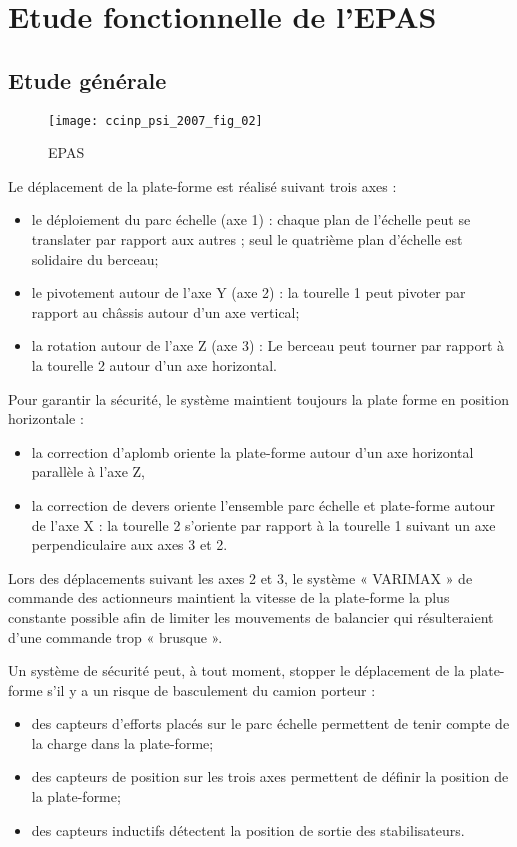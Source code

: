 \section{Etude fonctionnelle de l'EPAS}
\subsection{Etude générale}

\begin{figure}[H]
\centering
\texttt{[image: ccinp\_psi\_2007\_fig\_02]}
\caption{\label{ccinp_psi_2007_fig_02} EPAS}
\end{figure}

Le déplacement de la plate-forme est réalisé suivant trois axes :
\begin{itemize}
\item le déploiement du parc échelle (axe 1) : chaque plan de l’échelle peut se translater par
 rapport aux autres ; seul le quatrième plan d’échelle est solidaire du berceau;
\item le pivotement autour de l’axe Y (axe 2) : la tourelle 1 peut pivoter par rapport au
 châssis autour d’un axe vertical;
\item la rotation autour de l’axe Z (axe 3) : Le berceau peut tourner par rapport à la tourelle
 2 autour d’un axe horizontal.
\end{itemize}

 Pour garantir la sécurité, le système maintient toujours la plate forme en position horizontale :
\begin{itemize}
\item la correction d’aplomb oriente la plate-forme autour d’un axe horizontal parallèle à
 l’axe Z,
\item la correction de devers oriente l’ensemble parc échelle et plate-forme autour de l’axe
 X : la tourelle 2 s’oriente par rapport à la tourelle 1 suivant un axe perpendiculaire aux
 axes 3 et 2.
\end{itemize}
 Lors des déplacements suivant les axes 2 et 3, le système « VARIMAX » de commande des
 actionneurs maintient la vitesse de la plate-forme la plus constante possible afin de limiter les
 mouvements de balancier qui résulteraient d’une commande trop « brusque ».
 
 
Un système de sécurité peut, à tout moment, stopper le déplacement de la plate-forme s’il y a un risque de basculement du camion porteur :
\begin{itemize}
\item des capteurs d’efforts placés sur le parc échelle permettent de tenir compte de la charge dans la
 plate-forme;
\item des capteurs de position sur les trois axes permettent de définir la position de la plate-forme;
\item des capteurs inductifs détectent la position de sortie des stabilisateurs.
\end{itemize}

